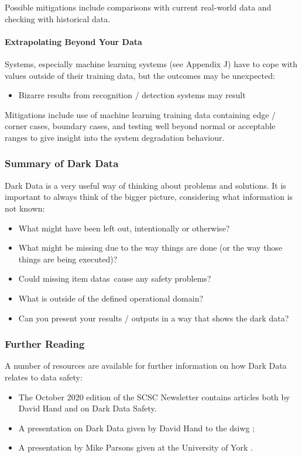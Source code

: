 Possible mitigations include comparisons with current real-world data and checking with historical data.

\paragraph{Extrapolating Beyond Your Data}\label{bkm:dark15}
Systems, especially machine learning systems (see Appendix J) have to cope with values outside of their training data, but the outcomes may be unexpected:
\begin{itemize}
\item Bizarre results from recognition / detection systems may result
\end{itemize}

Mitigations include use of machine learning training data containing edge / corner cases, boundary cases, and testing well beyond normal or acceptable ranges to give insight into the system degradation behaviour.
\subsubsection{Summary of Dark Data}
Dark Data is a very useful way of thinking about problems and solutions. It is important to always think of the bigger picture, considering what \gls{information} is not known:

\begin{itemize}
  \item What might have been left out, intentionally or otherwise?
  \item What might be missing due to the way things are done (or the way those things are being executed)?
  \item Could missing \cbstart\glspl{item data}\cbend\ cause any safety problems?
  \item What is outside of the defined operational domain?
  \item Can you present your results / outputs in a way that shows the dark data?
\end{itemize}

\subsubsection{Further Reading}
A number of resources are available for further \gls{information} on how Dark Data relates to data safety:
\begin{itemize}
\item The October 2020 edition of the SCSC Newsletter \cite{citation:SCSC160} contains articles both by David Hand and on Dark Data Safety.
  \item A presentation on Dark Data given by David Hand to the \gls{dsiwg} \cite{citation:darkdata:presentation1};
  \item A presentation by Mike Parsons given at the University of York \cite{citation:darkdata:presentation2}.
\end{itemize}
%
%
%
%
